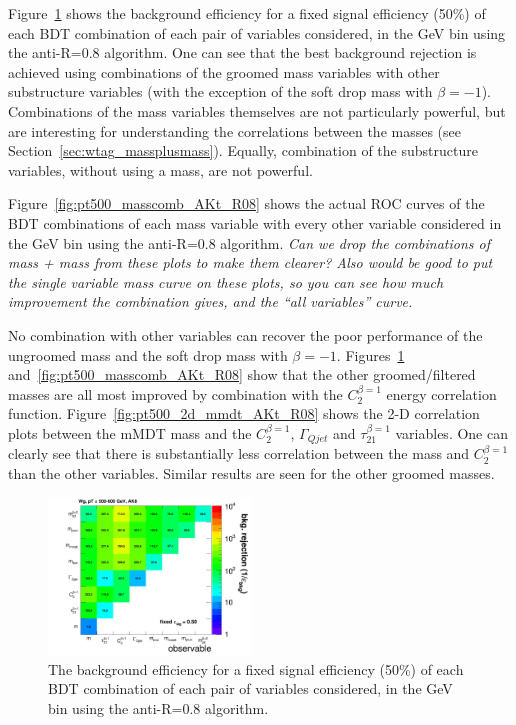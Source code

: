 Figure~\ref{fig:pt500_2Dcomb_AKt_R08} shows the background efficiency
for a fixed signal efficiency (50\%) of each BDT combination of
each pair of variables considered, in the  GeV bin using the anti-\kT R=0.8
algorithm. One can see that the best background rejection is achieved
using combinations of the groomed mass variables with other
substructure variables (with the exception
of the soft drop mass with $\beta=-1$). Combinations of the mass
variables themselves are not particularly powerful, but are
interesting for understanding the correlations between the masses (see
Section~\ref{sec:wtag_massplusmass}). Equally, combination of the
substructure variables, without using a mass, are not powerful. 

Figure~\ref{fig:pt500_masscomb_AKt_R08} shows the actual ROC curves of the BDT combinations of each mass variable with every other
variable considered in the  GeV bin using the anti-\kT R=0.8
algorithm. {\it Can we drop the combinations of mass + mass
from these plots to make them clearer? Also would be good to put the
single variable mass curve on these plots, so you can see how much
improvement the combination gives, and the ``all variables'' curve.}

No combination with other variables can recover the poor performance
of the ungroomed mass and the soft drop mass with
$\beta=-1$. Figures~\ref{fig:pt500_2Dcomb_AKt_R08}
and~\ref{fig:pt500_masscomb_AKt_R08} show that the
other groomed/filtered masses are all most improved by combination
with the $C_{2}^{\beta=1}$ energy correlation
function. Figure~\ref{fig:pt500_2d_mmdt_AKt_R08} shows the 2-D
correlation plots between the mMDT mass and the $C_{2}^{\beta=1}$,
$\Gamma_{Qjet}$ and $\tau_{21}^{\beta=1}$ variables. One can clearly
see that there is substantially less correlation between the mass and
$C_{2}^{\beta=1}$ than the other variables. Similar results are seen
for the other groomed masses.

\begin{figure}
\begin{center}
\includegraphics[width=0.48\textwidth]{./Figures/figs072514/figs071614_Wg_bin500_ak08/rocs/effBkg2D.png}
\caption{The background efficiency
for a fixed signal efficiency (50\%) of each BDT combination of
each pair of variables considered, in the  GeV bin using the anti-\kT R=0.8
algorithm.}
\label{fig:pt500_2Dcomb_AKt_R08}
\end{center}
\end{figure}


